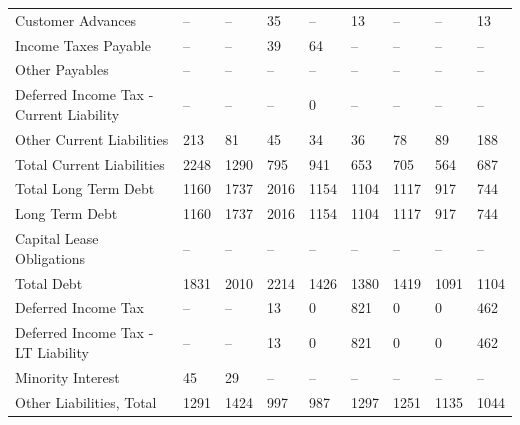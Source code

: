 \documentclass[grad,numbers]{coppe}
\begin{document}
\begin{longtable}[t]{lllllllll}
  \hspace{1em}\hspace{1em}Customer Advances & -- & -- & 35 & -- & 13 & -- & -- & 13\\
  \hspace{1em}\hspace{1em}Income Taxes Payable & -- & -- & 39 & 64 & -- & -- & -- & --\\
  \hspace{1em}\hspace{1em}Other Payables & -- & -- & -- & -- & -- & -- & -- & --\\
  \hspace{1em}\hspace{1em}Deferred Income Tax - Current Liability & -- & -- & -- & 0 & -- & -- & -- & --\\
  \hspace{1em}\hspace{1em}Other Current Liabilities & 213 & 81 & 45 & 34 & 36 & 78 & 89 & 188\\
  \hspace{1em}Total Current Liabilities & 2248 & 1290 & 795 & 941 & 653 & 705 & 564 & 687\\
  Total \hspace{1em}\hspace{1em}Long Term Debt & 1160 & 1737 & 2016 & 1154 & 1104 & 1117 & 917 & 744\\
  Long Term Debt & 1160 & 1737 & 2016 & 1154 & 1104 & 1117 & 917 & 744\\
  \hspace{1em}\hspace{1em}Capital Lease Obligations & -- & -- & -- & -- & -- & -- & -- & --\\
  \hspace{1em}Total Debt & 1831 & 2010 & 2214 & 1426 & 1380 & 1419 & 1091 & 1104\\
  \hspace{1em}Deferred Income Tax & -- & -- & 13 & 0 & 821 & 0 & 0 & 462\\
  \hspace{1em}\hspace{1em}Deferred Income Tax - LT Liability & -- & -- & 13 & 0 & 821 & 0 & 0 & 462\\
  \hspace{1em}Minority Interest & 45 & 29 & -- & -- & -- & -- & -- & --\\
  \hspace{1em}Other Liabilities, Total & 1291 & 1424 & 997 & 987 & 1297 & 1251 & 1135 & 1044\\

\end{longtable}
\end{document}
